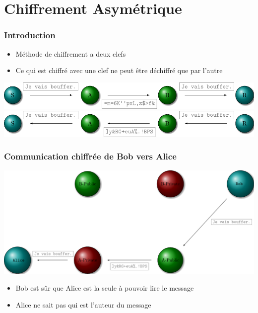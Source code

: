 \section{Chiffrement Asymétrique}

\begin{frame}
    \frametitle{Introduction}
    \begin{itemize}
        \item Méthode de chiffrement a deux clefs
        \item Ce qui est chiffré avec une clef ne peut être déchiffré que par l'autre
    \end{itemize}
    \begin{center}
        \includegraphics[scale=0.7]{res-src/asym_crypto}
        \vspace{4em}
        \includegraphics[scale=0.7]{res-src/asym_cryptor}
    \end{center}
\end{frame}


\begin{frame}
\frametitle{Communication chiffrée de Bob vers Alice}
    \begin{center}
        \includegraphics[scale=0.55]{res-src/asym_crypto_com}
    \end{center}
    \begin{itemize}
        \item Bob est sûr que Alice est la seule à pouvoir lire le message
        \item Alice ne sait pas qui est l'auteur du message
    \end{itemize}
\end{frame}

